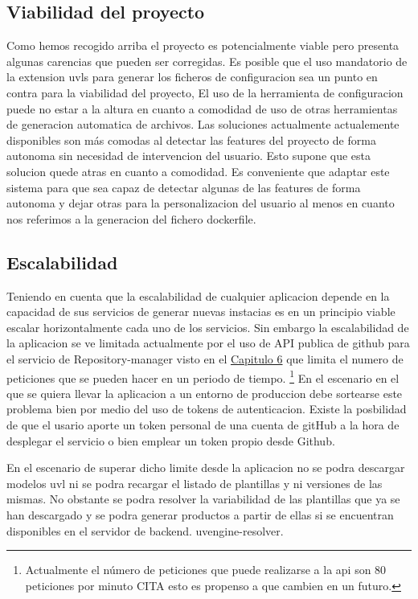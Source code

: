 \documentclass[12pt, a4paper, twoside]{article}
\begin{document}
\subsection{Viabilidad del proyecto}
Como hemos recogido arriba el proyecto es potencialmente viable pero presenta algunas carencias que pueden ser corregidas.
Es posible que el uso mandatorio de la extension uvls para generar los ficheros de configuracion sea un punto en contra para la viabilidad del proyecto, 
El uso de la herramienta de configuracion puede no estar a la altura en cuanto a comodidad de uso de otras herramientas de generacion automatica de archivos.
Las soluciones actualmente actualemente disponibles son más comodas al detectar las features del proyecto de forma autonoma sin necesidad de intervencion del usuario. Esto supone que esta solucion quede atras en cuanto a comodidad. 
Es conveniente que adaptar este sistema para que sea capaz de detectar algunas de las features de forma autonoma y dejar otras para la personalizacion del usuario al menos en cuanto nos referimos a la generacion del fichero dockerfile.

\subsection{Escalabilidad}
Teniendo en cuenta que la escalabilidad de cualquier aplicacion depende en la capacidad de sus servicios de generar nuevas instacias es en un principio viable 
escalar horizontalmente cada uno de los servicios. Sin embargo la escalabilidad de la aplicacion se ve limitada actualmente por el uso de API publica de github \cite{github_rest_api} 
para el servicio de Repository-manager visto en el \hyperref[sec:Desarrollo de los servicios de backend]{Capitulo 6} que limita el numero de peticiones que se pueden hacer en un periodo de tiempo.
\footnote{Actualmente el número de peticiones que puede realizarse a la api son 80 peticiones por minuto CITA esto es propenso a que cambien en un futuro.}
En el escenario en el que se quiera llevar la aplicacion a un entorno de produccion debe sortearse este problema bien por medio del uso de tokens de autenticacion.
Existe la posbilidad de que el usario aporte un token personal de una cuenta de gitHub a la hora de desplegar el servicio o bien emplear un token propio desde Github.

En el escenario de superar dicho limite desde la aplicacion no se podra descargar modelos uvl ni se podra recargar el listado de plantillas y ni versiones de las mismas.
No obstante se podra resolver la variabilidad de las plantillas que ya se han descargado y se podra generar productos a partir de ellas si se encuentran disponibles en el servidor de backend.
uvengine-resolver. 
\end{document}
